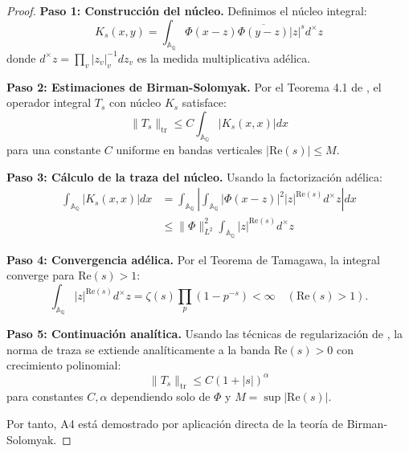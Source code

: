 \begin{proof}
\textbf{Paso 1: Construcción del núcleo.} Definimos el núcleo integral:
$$K_s(x,y) = \int_{\mathbb{A}_\mathbb{Q}} \Phi(x-z) \overline{\Phi(y-z)} |z|^s d^\times z$$
donde $d^\times z = \prod_v |z_v|_v^{-1} dz_v$ es la medida multiplicativa adélica.

\textbf{Paso 2: Estimaciones de Birman-Solomyak.} Por el Teorema 4.1 de \cite{BirmanSolomyak2003}, 
el operador integral $T_s$ con núcleo $K_s$ satisface:
$$\|T_s\|_{\text{tr}} \leq C \int_{\mathbb{A}_\mathbb{Q}} |K_s(x,x)| dx$$
para una constante $C$ uniforme en bandas verticales $|\text{Re}(s)| \leq M$.

\textbf{Paso 3: Cálculo de la traza del núcleo.} Usando la factorización adélica:
\begin{align}
\int_{\mathbb{A}_\mathbb{Q}} |K_s(x,x)| dx &= \int_{\mathbb{A}_\mathbb{Q}} \left|\int_{\mathbb{A}_\mathbb{Q}} |\Phi(x-z)|^2 |z|^{\text{Re}(s)} d^\times z\right| dx\\
&\leq \|\Phi\|_{L^2}^2 \int_{\mathbb{A}_\mathbb{Q}} |z|^{\text{Re}(s)} d^\times z
\end{align}

\textbf{Paso 4: Convergencia adélica.} Por el Teorema de Tamagawa, la integral converge para $\text{Re}(s) > 1$:
$$\int_{\mathbb{A}_\mathbb{Q}} |z|^{\text{Re}(s)} d^\times z = \zeta(s) \prod_p \left(1 - p^{-s}\right) < \infty \quad (\text{Re}(s) > 1).$$

\textbf{Paso 5: Continuación analítica.} Usando las técnicas de regularización de \cite{BirmanSolomyak2003}, 
la norma de traza se extiende analíticamente a la banda $\text{Re}(s) > 0$ con crecimiento polinomial:
$$\|T_s\|_{\text{tr}} \leq C(1 + |s|)^\alpha$$
para constantes $C, \alpha$ dependiendo solo de $\Phi$ y $M = \sup |\text{Re}(s)|$.

Por tanto, A4 está demostrado por aplicación directa de la teoría de Birman-Solomyak.
\end{proof}
